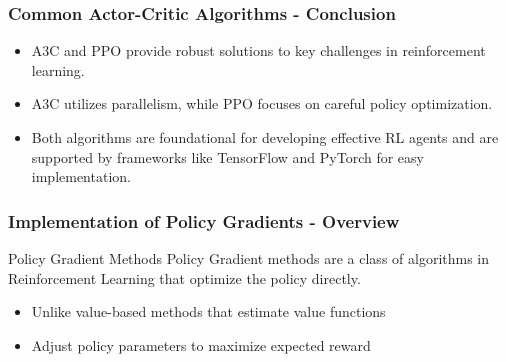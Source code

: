 \documentclass[aspectratio=169]{beamer}
\begin{document}
\begin{frame}[fragile]
    \frametitle{Common Actor-Critic Algorithms - Conclusion}
    \begin{itemize}
        \item A3C and PPO provide robust solutions to key challenges in reinforcement learning.
        \item A3C utilizes parallelism, while PPO focuses on careful policy optimization.
        \item Both algorithms are foundational for developing effective RL agents and are supported by frameworks like TensorFlow and PyTorch for easy implementation.
    \end{itemize}
\end{frame}

\begin{frame}[fragile]
    \frametitle{Implementation of Policy Gradients - Overview}
    \begin{block}{Policy Gradient Methods}
        Policy Gradient methods are a class of algorithms in Reinforcement Learning that optimize the policy directly.
        \begin{itemize}
            \item Unlike value-based methods that estimate value functions
            \item Adjust policy parameters to maximize expected reward
        \end{itemize}
    \end{block}
\end{frame}
\end{document}
